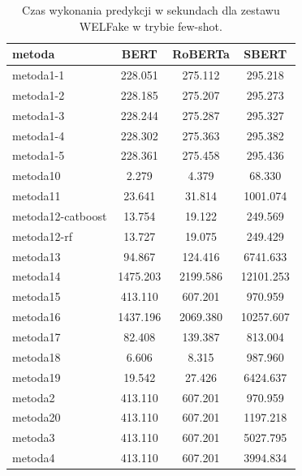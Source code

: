 \begin{table}[H]
	\centering
	\caption{Czas wykonania predykcji w sekundach dla zestawu WELFake w trybie few-shot.}
	\label{tab:execution_time_few_shot_welfake}
	\small
	\begin{tabular}{lccc}
		\toprule
		\textbf{metoda}   & \textbf{BERT} & \textbf{RoBERTa} & \textbf{SBERT} \\
		\midrule
		metoda1-1         & 228.051       & 275.112          & 295.218        \\
		metoda1-2         & 228.185       & 275.207          & 295.273        \\
		metoda1-3         & 228.244       & 275.287          & 295.327        \\
		metoda1-4         & 228.302       & 275.363          & 295.382        \\
		metoda1-5         & 228.361       & 275.458          & 295.436        \\
		metoda10          & 2.279         & 4.379            & 68.330         \\
		metoda11          & 23.641        & 31.814           & 1001.074       \\
		metoda12-catboost & 13.754        & 19.122           & 249.569        \\
		metoda12-rf       & 13.727        & 19.075           & 249.429        \\
		metoda13          & 94.867        & 124.416          & 6741.633       \\
		metoda14          & 1475.203      & 2199.586         & 12101.253      \\
		metoda15          & 413.110       & 607.201          & 970.959        \\
		metoda16          & 1437.196      & 2069.380         & 10257.607      \\
		metoda17          & 82.408        & 139.387          & 813.004        \\
		metoda18          & 6.606         & 8.315            & 987.960        \\
		metoda19          & 19.542        & 27.426           & 6424.637       \\
		metoda2           & 413.110       & 607.201          & 970.959        \\
		metoda20          & 413.110       & 607.201          & 1197.218       \\
		metoda3           & 413.110       & 607.201          & 5027.795       \\
		metoda4           & 413.110       & 607.201          & 3994.834       \\

\end{tabular}
\end{table}
